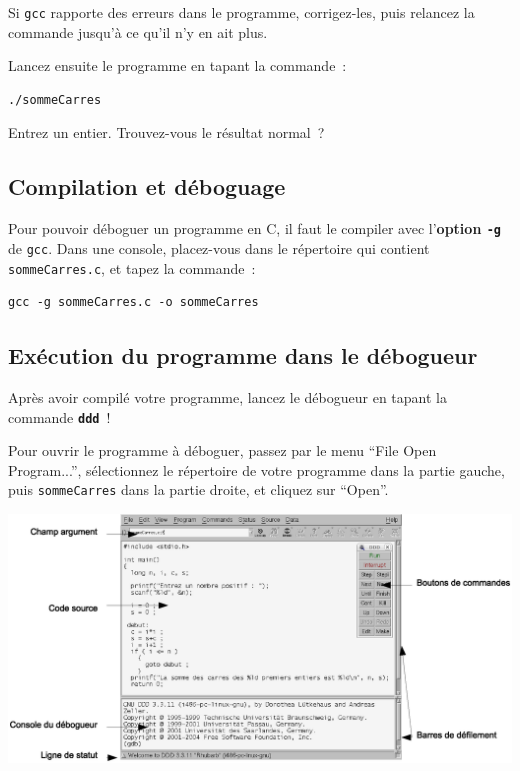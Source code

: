 \documentclass[12pt,a4paper]{article}
\begin{document}
Si \texttt{gcc} rapporte des erreurs dans le programme, corrigez-les,
puis relancez la commande jusqu'à ce qu'il n'y en ait plus.

Lancez ensuite le programme en tapant la commande~:
\begin{verbatim}
./sommeCarres
\end{verbatim}

Entrez un entier. Trouvez-vous le résultat normal~?

\subsection{Compilation et déboguage}

Pour pouvoir déboguer un programme en C, il faut le compiler avec
l'{\bf option \tt -g} de {\tt gcc}. Dans une console, placez-vous dans
le répertoire qui contient {\tt sommeCarres.c}, et tapez la commande~:
\begin{verbatim}
gcc -g sommeCarres.c -o sommeCarres
\end{verbatim}


\subsection{Exécution du programme dans le débogueur}

Après avoir compilé votre programme, lancez le débogueur en tapant la
commande {\bf \tt ddd}~!

Pour ouvrir le programme à déboguer, passez par le menu ``File \puis
Open Program...'', sélectionnez le répertoire de votre programme dans
la partie gauche, puis {\tt sommeCarres} dans la partie droite, et
cliquez sur ``Open''.


\begin{center}
  \includegraphics[width=\linewidth]{ddd2.eps}
\end{center}
\end{document}
